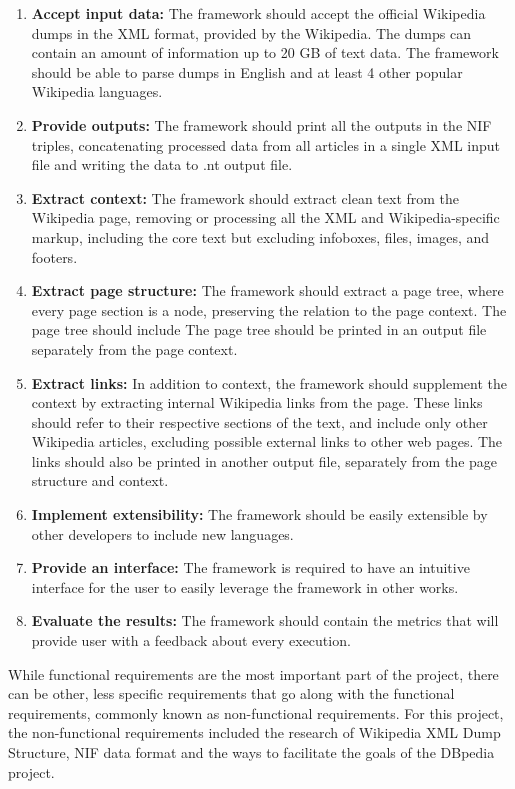 \documentclass[thesis=M,english,hidelinks]{FITthesis}[2019/12/23]
\begin{document}
\begin{enumerate}
	\item \textbf{Accept input data:} The framework should accept the official  Wikipedia dumps in the \gls{XML} format, provided by the Wikipedia. The dumps can contain an amount of information up to 20 GB of text data. The framework should be able to parse dumps in English and at least 4 other popular Wikipedia languages.
	\item \textbf{Provide outputs:} The framework should print all the outputs in the \gls{NIF} triples, concatenating processed data from all articles in a single \gls{XML} input file and writing the data to .nt output file.
	\item \textbf{Extract context:} The framework should extract clean text from the Wikipedia page, removing or processing all the \gls{XML} and Wikipedia-specific markup, including the core text but excluding infoboxes, files, images, and footers.
	\item \textbf{Extract page structure:} The framework should extract a page tree, where every page section is a node, preserving the relation to the page context. The page tree should include The page tree should be printed in an output file separately from the page context. 
	\item \textbf{Extract links:} In addition to context, the framework should supplement the context by extracting internal Wikipedia links from the page. These links should refer to their respective sections of the text, and include only other Wikipedia articles, excluding possible external links to other web pages. The links should also be printed in another output file, separately from the page structure and context.
	\item \textbf{Implement extensibility:} The framework should be easily extensible by other developers to include new languages.
	\item \textbf{Provide an interface:} The framework is required to have an intuitive interface for the user to easily leverage the framework in other works.
	\item \textbf{Evaluate the results:} The framework should contain the metrics that will provide user with a feedback about every execution.
\end{enumerate} 

While functional requirements are the most important part of the project, there can be other, less specific requirements that go along with the functional requirements, commonly known as non-functional requirements. For this project, the non-functional requirements included the research of Wikipedia \gls{XML} Dump Structure, \gls{NIF} data format and the ways to facilitate the goals of the DBpedia project.
\end{document}
